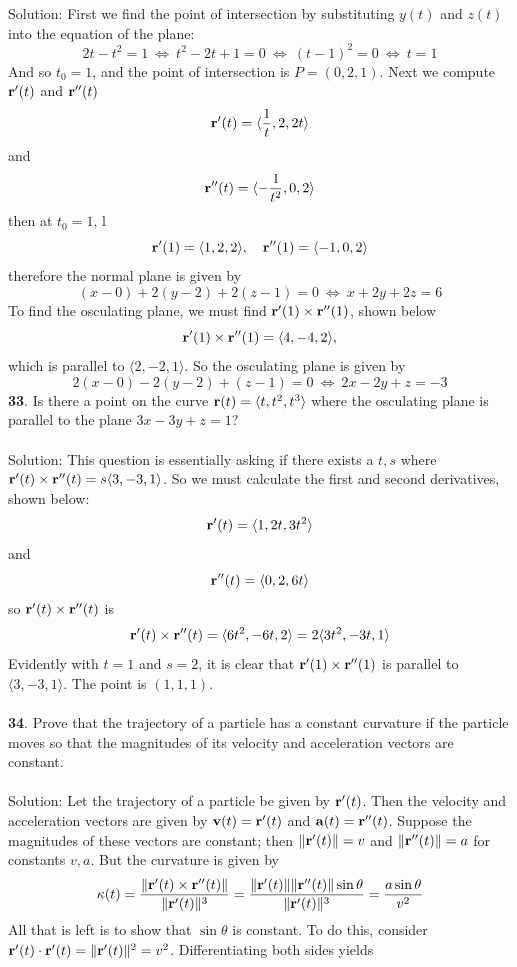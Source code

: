 \documentclass[12pt]{amsbook}
\newcommand{\la}{\langle}
\newcommand{\ra}{\rangle}
\begin{document}
\\
\\
{\sc Solution}: First we find the point of intersection by substituting $y(t)$ and $z(t)$ into the equation of the plane:
$$2t-t^2=1 \ \Leftrightarrow \ t^2-2t+1=0 \ \Leftrightarrow \ (t-1)^2=0 \ \Leftrightarrow \ t=1$$
And so $t_0=1$, and the point of intersection is $P=(0,2,1)$. Next we compute ${\bf r}'(t)$ and ${\bf r}''(t)$
$${\bf r}'(t)=\la \frac{1}{t}, 2, 2t \ra$$
and
$${\bf r}''(t)=\la -\frac{1}{t^2}, 0, 2 \ra$$
then at $t_0=1$,
l$${\bf r}'(1)=\la 1,2,2 \ra, \ \ \ {\bf r}''(1)=\la -1,0,2 \ra$$
therefore the normal plane is given by
$$(x-0)+2(y-2)+2(z-1)=0 \ \Leftrightarrow \ x+2y+2z=6$$
To find the osculating plane, we must find ${\bf r}'(1)\times{\bf r}''(1)$, shown below
$${\bf r}'(1)\times{\bf r}''(1)=\la 4,-4,2 \ra,$$
which is parallel to $\la 2,-2,1 \ra$. So the osculating plane is given by
$$2(x-0)-2(y-2)+(z-1)=0 \ \Leftrightarrow \ 2x-2y+z=-3$$
{\small\bf 33}. Is there a point on the curve ${\bf r}(t)=\la t,t^2,t^3 \ra$ where the osculating
plane is parallel to the plane $3x-3y+z=1$?
\\
\\
{\sc Solution}: This question is essentially asking if there exists a $t,s$ where ${\bf r}'(t)\times{\bf r}''(t)=s\la 3,-3,1 \ra$. So we must calculate the first and second derivatives, shown below:
$${\bf r}'(t)=\la 1,2t, 3t^2 \ra$$
and
$${\bf r}''(t)=\la 0,2,6t \ra$$
so ${\bf r}'(t)\times{\bf r}''(t)$ is
$${\bf r}'(t)\times{\bf r}''(t)=\la 6t^2,-6t,2 \ra=2\la 3t^2,-3t,1 \ra$$
Evidently with $t=1$ and $s=2$, it is clear that ${\bf r}'(1)\times{\bf r}''(1)$ is parallel to $\la 3,-3,1\ra$. The point is $(1,1,1)$.
\\
\\
{\small\bf 34}. Prove that the trajectory of a particle has a constant curvature if the
particle moves so that the magnitudes of its velocity and acceleration vectors
are constant.
\\
\\
{\sc Solution}: Let the trajectory of a particle be given by ${\bf r}'(t)$. Then the velocity and acceleration vectors are given by ${\bf v}(t)={\bf r}'(t)$ and ${\bf a}(t)={\bf r}''(t)$. Suppose the magnitudes of these vectors are constant; then $\|{\bf r}'(t)\|=v$ and $\|{\bf r}''(t)\|=a$ for constants $v,a$. But the curvature is given by
$$\kappa(t)=\frac{\|{\bf r}'(t)\times{\bf r}''(t)\|}{\|{\bf r}'(t)\|^3}=\frac{\|{\bf r}'(t)\|\|{\bf r}''(t)\|\sin \theta}{\|{\bf r}'(t)\|^3}=\frac{a\sin \theta}{v^2}$$
All that is left is to show that $\sin \theta$ is constant. To do this, consider ${\bf r}'(t)\cdot{\bf r}'(t)=\|{\bf r}'(t)\|^2=v^2$. Differentiating both sides yields
\end{document}
